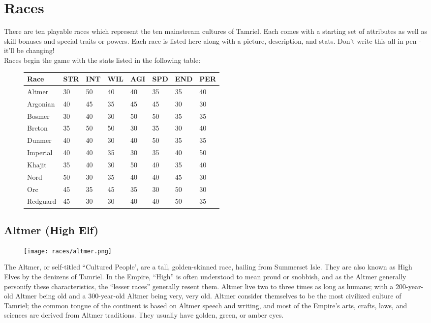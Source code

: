 \section{Races}
There are ten playable races which represent the ten mainstream cultures of Tamriel. Each comes with a starting set of attributes as well as skill bonuses and special traits or powers. Each race is listed here along with a picture, description, and stats. Don't write this all in pen - it'll be changing!\\

Races begin the game with the stats listed in the following table:
\begin{figure}[h]
\begin{tabular}[h]{|p{}|p{}p{}p{}p{}p{}p{}p{}|}
	\hline
	\textbf{Race} & STR & INT & WIL & AGI & SPD & END & PER\\
	\hline
	Altmer & 30 & 50 & 40 & 40 & 35 & 35 & 40\\
	\hline
	Argonian & 40 & 45 & 35 & 45 & 45 & 30 & 30\\
	\hline
	Bosmer & 30 & 40 & 30 & 50 & 50 & 35 & 35\\
	\hline
	Breton & 35 & 50 & 50 & 30 & 35 & 30 & 40\\
	\hline
	Dunmer & 40 & 40 & 30 & 40 & 50 & 35 & 35\\
	\hline
	Imperial & 40 & 40 & 35 & 30 & 35 & 40 & 50\\
	\hline
	Khajit & 35 & 40 & 30 & 50 & 40 & 35 & 40\\
	\hline
	Nord & 50 & 30 & 35 & 40 & 40 & 45 & 30\\
	\hline
	Orc & 45 & 35 & 45 & 35 & 30 & 50 & 30\\
	\hline
	Redguard & 45 & 30 & 30 & 40 & 40 & 50 & 35\\
	\hline
\end{tabular}
\end{figure}

\subsection{Altmer (High Elf)}
\begin{wrapfigure}{L}{0.3\textwidth}
	\texttt{[image: races/altmer.png]}
\end{wrapfigure}

The Altmer, or self-titled ``Cultured People', are a tall, golden-skinned race, hailing from Summerset Isle. They are also known as High Elves by the denizens of Tamriel. In the Empire, ``High'' is often understood to mean proud or snobbish, and as the Altmer generally personify these characteristics, the ``lesser races'' generally resent them. Altmer live two to three times as long as humans; with a 200-year-old Altmer being old and a 300-year-old Altmer being very, very old. Altmer consider themselves to be the most civilized culture of Tamriel; the common tongue of the continent is based on Altmer speech and writing, and most of the Empire's arts, crafts, laws, and sciences are derived from Altmer traditions. They usually have golden, green, or amber eyes.\\

